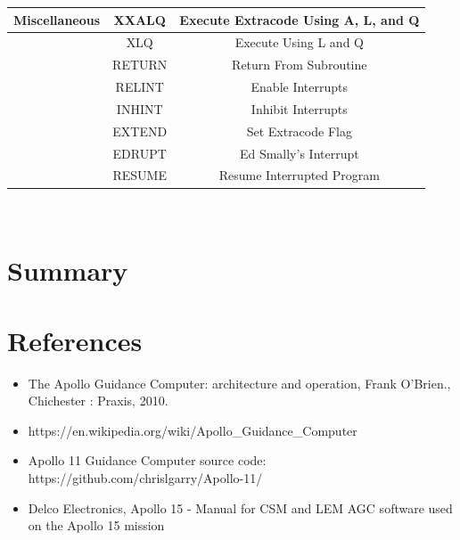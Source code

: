 \documentclass[a4paper,11pt]{article}
\begin{document}
\begin{center}
\begin{tabular}{| c | c | c |}
	Miscellaneous & XXALQ & Execute Extracode Using A, L, and Q \\ \hline
	& XLQ & Execute Using L and Q \\ \hline
	& RETURN & Return From Subroutine \\ \hline
	& RELINT & Enable Interrupts \\ \hline
	& INHINT & Inhibit Interrupts \\ \hline
	& EXTEND & Set Extracode Flag \\ \hline
	& EDRUPT & Ed Smally's Interrupt \\ \hline	
	& RESUME & Resume Interrupted Program \\ \hline	
	
\end{tabular} \\
\end{center}


\section{Summary}



\section{References}

\begin{itemize}
  \item The Apollo Guidance Computer: architecture and operation, Frank O'Brien., Chichester : Praxis, 2010.
  \item https://en.wikipedia.org/wiki/Apollo\_Guidance\_Computer
  \item Apollo 11 Guidance Computer source code: https://github.com/chrislgarry/Apollo-11/
  \item Delco Electronics, Apollo 15 - Manual for CSM and LEM AGC software used on the Apollo 15 mission
\end{itemize}
\end{document}
